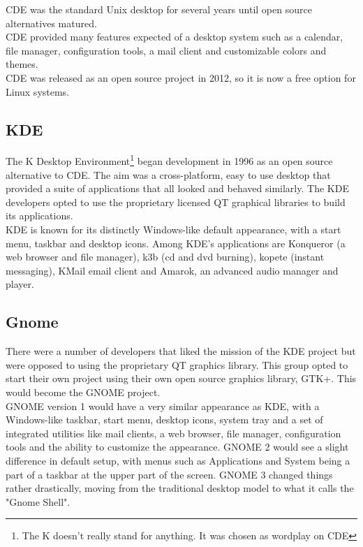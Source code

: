 CDE was the standard Unix desktop for several years until open source alternatives matured.\\

CDE provided many features expected of a desktop system such as a calendar, file manager, configuration tools, a mail client and customizable colors and themes.\\

CDE was released as an open source project in 2012, so it is now a free option for Linux systems.

\subsection{KDE}

The K Desktop Environment\footnote{The K doesn't really stand for anything.  It was chosen as wordplay on CDE} began development in 1996 as an open source alternative to CDE.  The aim was a cross-platform, easy to use desktop that provided a suite of applications that all looked and behaved similarly.  The KDE developers opted to use the proprietary licensed QT graphical libraries to build its applications.\\

KDE is known for its distinctly Windows-like default appearance, with a start menu, taskbar and desktop icons.  Among KDE's applications are Konqueror (a web browser and file manager), k3b (cd and dvd burning), kopete (instant messaging), KMail email client and Amarok, an advanced audio manager and player.

\subsection{Gnome}

There were a number of developers that liked the mission of the KDE project but were opposed to using the proprietary QT graphics library.  This group opted to start their own project using their own open source graphics library, GTK+.  This would become the GNOME project.\\

GNOME version 1 would have a very similar appearance as KDE, with a Windows-like taskbar, start menu, desktop icons, system tray and a set of integrated utilities like mail clients, a web browser, file manager, configuration tools and the ability to customize the appearance.  GNOME 2 would see a slight difference in default setup, with menus such as Applications and System being a part of a taskbar at the upper part of the screen.  GNOME 3 changed things rather drastically, moving from the traditional desktop model to what it calls the "Gnome Shell".\\

